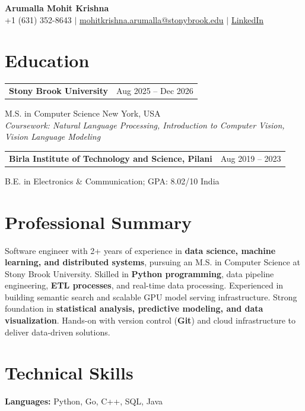 \documentclass[letterpaper,10pt]{article}
\makeatletter
\newcommand{\entry}[2]{%
  \noindent
  \begin{tabularx}{\linewidth}
    {@{}>{\raggedright\arraybackslash}X@{\hspace{6pt}}r@{}}
    \textbf{#1} & #2
  \end{tabularx}\par
}
\makeatother
\begin{document}
\begin{center}
    {\LARGE\bfseries Arumalla Mohit Krishna}\\[3pt]
    +1 (631) 352-8643 $|$
    \href{mailto:mohitkrishna.arumalla@stonybrook.edu}
    {mohitkrishna.arumalla@stonybrook.edu} $|$
    \href{https://linkedin.com/in/mohit-krishna-arumalla}
    {LinkedIn}
\end{center}
\vspace{-8pt}

\section{Education}

\entry
  {\textbf{Stony Brook University}}
  {Aug 2025 -- Dec 2026}

M.S. in Computer Science \hfill New York, USA\\
\textit{
Coursework: Natural Language Processing,
Introduction to Computer Vision, Vision Language Modeling
}
\vspace{3pt}

\entry
  {\textbf{Birla Institute of Technology and Science, Pilani}}
  {Aug 2019 -- 2023}

B.E. in Electronics \& Communication; GPA: 8.02/10 \hfill India
\section{Professional Summary}

Software engineer with 2+ years of experience in \textbf{data science, machine learning, and distributed systems}, pursuing an M.S. in Computer Science at Stony Brook University. Skilled in \textbf{Python programming}, data pipeline engineering, \textbf{ETL processes}, and real-time data processing. Experienced in building semantic search and scalable GPU model serving infrastructure. Strong foundation in \textbf{statistical analysis, predictive modeling, and data visualization}. Hands-on with version control (\textbf{Git}) and cloud infrastructure to deliver data-driven solutions.

\section{Technical Skills}

\textbf{Languages:}
Python, Go, C++, SQL, Java\\
\end{document}
